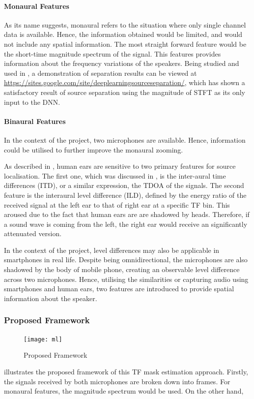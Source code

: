 \documentclass[a4paper,twoside,12pt,hidelinks]{article}
\begin{document}
\paragraph{Monaural Features}
As its name suggests, monaural refers to the situation where only single channel data is available. Hence, the information obtained would be limited, and would not include any spatial information. The most straight forward feature would be the short-time magnitude spectrum of the signal. This features provides information about the frequency variations of the speakers. Being studied and used in \cite{Huang2015JointSeparation}, a demonstration of separation results can be viewed at \url{https://sites.google.com/site/deeplearningsourceseparation/}, which has shown a satisfactory result of source separation using the magnitude of STFT as its only input to the DNN.

\paragraph{Binaural Features}
In the context of the project, two microphones are available. Hence, information could be utilised to further improve the monaural zooming. 

As described in \cite{darwin2008listening}, human ears are sensitive to two primary features for source localisation. The first one, which was discussed in , is the inter-aural time differences (ITD), or a similar expression, the TDOA of the signals. The second feature is the interaural level difference (ILD), defined by the energy ratio of the received signal at the left ear to that of right ear at a specific TF bin. \cite{Jiang2014BinauralNetworks} This aroused due to the fact that human ears are are shadowed by heads. Therefore, if a sound wave is coming from the left, the right ear would receive an significantly attenuated version. 

In the context of the project, level differences may also be applicable in smartphones in real life. Despite being omnidirectional, the microphones are also shadowed by the body of mobile phone, creating an observable level difference across two microphones. Hence, utilising the similarities or capturing audio using smartphones and human ears, two features are introduced to provide spatial information about the speaker. 

\subsubsection{Proposed Framework}
\begin{figure}[H]
\centering
\texttt{[image: ml]}
\caption{Proposed Framework}
\label{fig:ml}
\end{figure}
 illustrates the proposed framework of this TF mask estimation approach. Firstly, the signals received by both microphones are broken down into frames. For monaural features, the magnitude spectrum would be used. On the other hand, 
\end{document}
